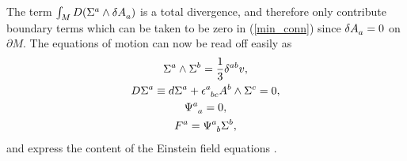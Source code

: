 \documentclass[a4paper,12pt, onecolumn, notitlepage]{article}
\theoremstyle{definition}
\theoremstyle{remark}
\newcommand{\e}{\epsilon}
\begin{document}
The term $\int_{M} D(\Sigma\indices{^a}\wedge\delta A\indices{_a})$ is a total divergence, and therefore only contribute boundary terms which can be taken to be zero in (\ref{min_conn}) since $\delta A\indices{_a}=0$ on $\partial M.$ The equations of motion can now be read off easily as
\begin{subequations}
	\begin{gather}
\label{prop_vol_form}
\Sigma^{a}\wedge\Sigma^{b} = \frac{1}{3}\delta^{ab}v,\\
\label{cov_derivative}
D\Sigma^{a} \equiv d\Sigma^{a} + \e\indices{^a_b_c}A^{b}\wedge\Sigma^{c} = 0,\\
\label{traceless}
\Psi\indices{^a_a} = 0,\\
\label{weyl}
F^{a} = \Psi\indices{^a_b}\Sigma^{b},
	\end{gather}
\end{subequations}
and express the content of the Einstein field equations \cite{capovilla_1989, capovilla_1993}.\\
\end{document}
